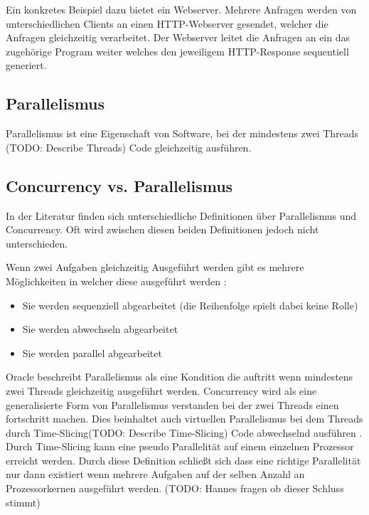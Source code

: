 Ein konkretes Beispiel dazu bietet ein Webserver. Mehrere Anfragen werden von unterschiedlichen Clients an einen HTTP-Webserver gesendet, welcher die Anfragen gleichzeitig verarbeitet. Der Webserver leitet die Anfragen an ein das zugehörige Program weiter welches den jeweiligem HTTP-Response sequentiell generiert. \cite[p. 18]{Can08}


\subsection{Parallelismus}
\label{section:Parallelismus}

Parallelismus ist eine Eigenschaft von Software, bei der mindestens zwei Threads (TODO: Describe Threads) Code gleichzeitig ausführen. 


\subsection{Concurrency vs. Parallelismus}
\label{section:Parallelismus}

In der Literatur finden sich unterschiedliche Definitionen über Parallelismus und Concurrency. Oft wird zwischen diesen beiden Definitionen jedoch nicht unterschieden.

Wenn zwei Aufgaben gleichzeitig Ausgeführt werden gibt es mehrere Möglichkeiten in welcher diese ausgeführt werden \cite[p. 14]{Erb2012}:

\begin{itemize}
  \item Sie werden sequenziell abgearbeitet (die Reihenfolge spielt dabei keine Rolle)
  \item Sie werden abwechseln abgearbeitet
  \item Sie werden parallel abgearbeitet
\end{itemize}


Oracle beschreibt Parallelismus als eine Kondition die auftritt wenn mindestens zwei Threads gleichzeitig ausgeführt werden. Concurrency wird als eine generalisierte Form von Parallelismus verstanden bei der zwei Threads einen fortschritt machen. Dies beinhaltet auch virtuellen Parallelismus bei dem Threads durch Time-Slicing(TODO: Describe Time-Slicing) Code abwechselnd ausführen \cite[]{oracle:multithreading}. Durch Time-Slicing kann eine pseudo Parallelität auf einem einzelnen Prozessor erreicht werden. Durch diese Definition schließt sich dass eine richtige Parallelität nur dann existiert wenn mehrere Aufgaben auf der selben Anzahl an Prozessorkernen ausgeführt werden. (TODO: Hannes fragen ob dieser Schluss stimmt)

